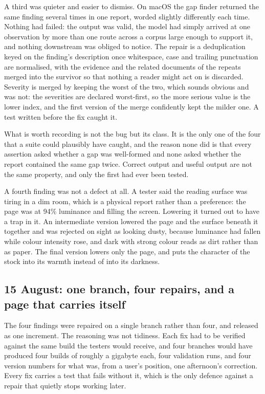\documentclass[11pt,a4paper]{article}
\begin{document}
A third was quieter and easier to dismiss. On macOS the gap finder returned the
same finding several times in one report, worded slightly differently each time.
Nothing had failed: the output was valid, the model had simply arrived at one
observation by more than one route across a corpus large enough to support it,
and nothing downstream was obliged to notice. The repair is a deduplication
keyed on the finding's description once whitespace, case and trailing
punctuation are normalised, with the evidence and the related documents of the
repeats merged into the survivor so that nothing a reader might act on is
discarded. Severity is merged by keeping the worst of the two, which sounds
obvious and was not: the severities are declared worst-first, so the more
serious value is the lower index, and the first version of the merge confidently
kept the milder one. A test written before the fix caught it.

What is worth recording is not the bug but its class. It is the only one of the
four that a suite could plausibly have caught, and the reason none did is that
every assertion asked whether a gap was well-formed and none asked whether the
report contained the same gap twice. Correct output and useful output are not
the same property, and only the first had ever been tested.

A fourth finding was not a defect at all. A tester said the reading surface was
tiring in a dim room, which is a physical report rather than a preference: the
page was at 94\% luminance and filling the screen. Lowering it turned out to
have a trap in it. An intermediate version lowered the page and the surface
beneath it together and was rejected on sight as looking dusty, because
luminance had fallen while colour intensity rose, and dark with strong colour
reads as dirt rather than as paper. The final version lowers only the page, and
puts the character of the stock into its warmth instead of into its darkness.

\subsection{15 August: one branch, four repairs, and a page that carries itself}

The four findings were repaired on a single branch rather than four, and
released as one increment. The reasoning was not tidiness. Each fix had to be
verified against the same build the testers would receive, and four branches
would have produced four builds of roughly a gigabyte each, four validation
runs, and four version numbers for what was, from a user's position, one
afternoon's correction. Every fix carries a test that fails without it, which is
the only defence against a repair that quietly stops working later.
\end{document}
